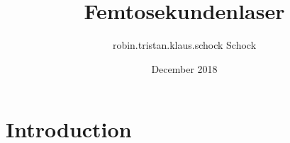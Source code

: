 \documentclass{article}
\title{Femtosekundenlaser}
\author{robin.tristan.klaus.schock Schock}
\date{December 2018}
\begin{document}
\maketitle

\section{Introduction}
\end{document}
